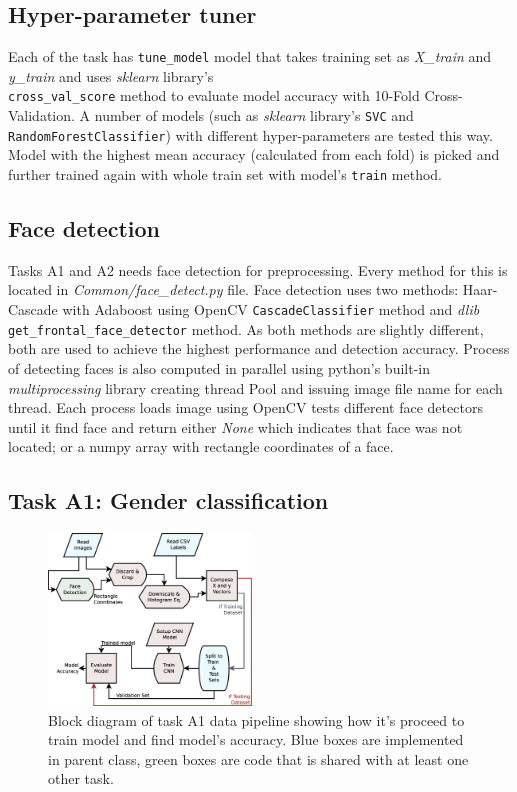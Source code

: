 \documentclass{article}
\begin{document}
\subsection{Hyper-parameter tuner}
\label{sub:hypertune}
Each of the task has \texttt{tune\_model} model that takes training set as \textit{X\_train} and \textit{y\_train} and uses \textit{sklearn} library's \\\texttt{cross\_val\_score} method to evaluate model accuracy with 10-Fold Cross-Validation. A number of models (such as \textit{sklearn} library's \texttt{SVC} and \texttt{RandomForestClassifier}) with different hyper-parameters are tested this way. Model with the highest mean accuracy (calculated from each fold) is picked and further trained again with whole train set with model's \texttt{train} method.

\subsection{Face detection}
\label{sub:face_detect}
Tasks A1 and A2 needs face detection for preprocessing. Every method for this is located in \textit{Common/face\_detect.py} file. Face detection uses two methods: Haar-Cascade with Adaboost using OpenCV \texttt{CascadeClassifier} method and \textit{dlib} \texttt{get\_frontal\_face\_detector} method. As both methods are slightly different, both are used to achieve the highest performance and detection accuracy. Process of detecting faces is also computed in parallel using python's built-in \textit{multiprocessing} library creating thread Pool and issuing image file name for each thread. Each process loads image using OpenCV tests different face detectors until it find face and return either \textit{None} which indicates that face was not located; or a numpy array with rectangle coordinates of a face. 

\subsection{Task A1: Gender classification}

\begin{figure}[htb]
	\centering
	\includegraphics[width=0.48\textwidth]{graphics/A1_diagram.eps}
	\caption{Block diagram of task A1 data pipeline showing how it's proceed to train model and find model's accuracy. Blue boxes are implemented in parent class, green boxes are code that is shared with at least one other task.}
	\label{fig:block_a1}
\end{figure}
\end{document}
